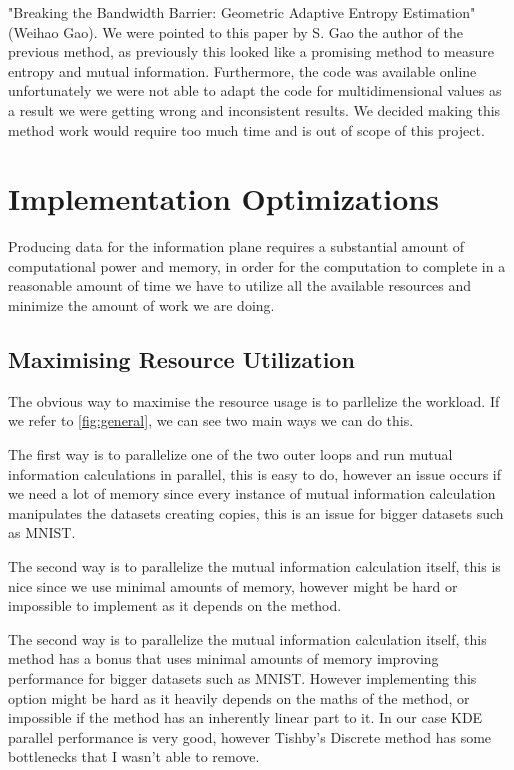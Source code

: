   "Breaking the Bandwidth Barrier: Geometric Adaptive Entropy Estimation"
  (Weihao Gao). We were pointed to this paper by S. Gao the author of the
  previous method, as previously this looked like a promising method to measure
  entropy and mutual information. Furthermore, the code was available online
  unfortunately we were not able to adapt the code for multidimensional values
  as a result we were getting wrong and inconsistent results. We decided making
  this method work would require too much time and is out of scope of this
  project.

\section{Implementation Optimizations}

Producing data for the information plane requires a substantial amount of
computational power and memory, in order for the computation to complete in a
reasonable amount of time we have to utilize all the available resources and
minimize the amount of work we are doing.

\subsection{Maximising Resource Utilization}

The obvious way to maximise the resource usage is to parllelize the workload.
If we refer to \autoref{fig:general}, we can see two main ways we can do this.

The first way is to parallelize one of the two outer loops and run mutual
information calculations in parallel, this is easy to do, however an issue
occurs if we need a lot of memory since every instance of mutual information
calculation manipulates the datasets creating copies, this is an issue for
bigger datasets such as MNIST.

The second way is to parallelize the mutual information calculation itself, this
is nice since we use minimal amounts of memory, however might be hard or
impossible to implement as it depends on the method.

The second way is to parallelize the mutual information calculation itself, this
method has a  bonus that uses minimal amounts of memory improving performance
for bigger datasets such as MNIST. However implementing this option might be
hard as it heavily depends on the maths of the method, or impossible if the
method has an inherently linear part to it. In our case KDE parallel performance
is very good, however Tishby's Discrete method has some bottlenecks that I
wasn't able to remove.

